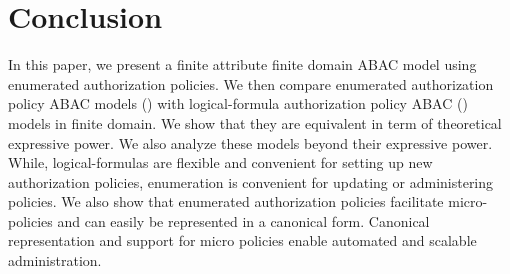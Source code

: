 \section{Conclusion}
\label{sec:conclusion}

In this paper, we present a finite attribute finite domain ABAC model using enumerated authorization policies. We then compare enumerated authorization policy ABAC models (\EPModels) with logical-formula authorization policy ABAC (\LPModels) models in finite domain. We show that they are equivalent in term of theoretical expressive power. We also analyze these models beyond their expressive power. While, logical-formulas are flexible and convenient for setting up new authorization  policies, enumeration is convenient for updating or administering policies. We also show that enumerated authorization policies facilitate micro-policies and can easily be represented in a canonical form. Canonical representation and support for micro policies enable automated and scalable administration. 



